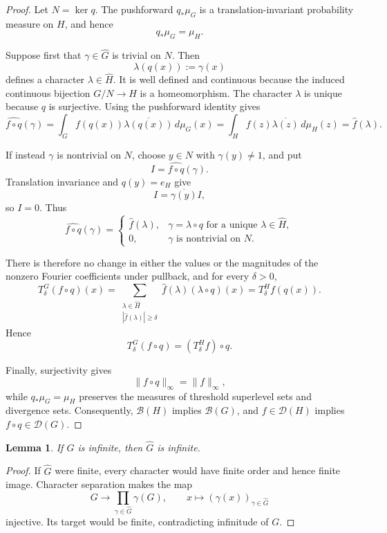 \documentclass[11pt]{amsart}
\newtheorem{lemma}[theorem]{Lemma}
\theoremstyle{definition}
\theoremstyle{remark}
\newcommand{\B}{\mathcal B}
\newcommand{\D}{\mathcal D}
\begin{document}
\begin{proof}
Let \(N=\ker q\). The pushforward \(q_*\mu_G\) is a
translation-invariant probability measure on \(H\), and hence
\[
 q_*\mu_G=\mu_H.
\]

Suppose first that \(\gamma\in\widehat G\) is trivial on \(N\). Then
\[
 \lambda(q(x)):=\gamma(x)
\]
defines a character \(\lambda\in\widehat H\). It is well defined and
continuous because the induced continuous bijection \(G/N\to H\) is a
homeomorphism. The character \(\lambda\) is unique because \(q\) is
surjective. Using the pushforward identity gives
\[
 \widehat{f\circ q}(\gamma)
 =\int_G f(q(x))\overline{\lambda(q(x))}\,d\mu_G(x)
 =\int_H f(z)\overline{\lambda(z)}\,d\mu_H(z)
 =\widehat f(\lambda).
\]

If instead \(\gamma\) is nontrivial on \(N\), choose \(y\in N\) with
\(\gamma(y)\neq1\), and put
\[
I=\widehat{f\circ q}(\gamma).
\]
Translation invariance and \(q(y)=e_H\) give
\[
 I=\overline{\gamma(y)}I,
\]
so \(I=0\). Thus
\[
 \widehat{f\circ q}(\gamma)
 =
 \begin{cases}
  \widehat f(\lambda),
   & \gamma=\lambda\circ q
     \text{ for a unique }\lambda\in\widehat H,\\
  0,
   & \gamma\text{ is nontrivial on }N.
 \end{cases}
\]

There is therefore no change in either the values or the magnitudes of
the nonzero Fourier coefficients under pullback, and for every
\(\delta>0\),
\[
 T_\delta^G(f\circ q)(x)
 =
 \sum_{\substack{\lambda\in\widehat H\\
                  |\widehat f(\lambda)|\ge\delta}}
 \widehat f(\lambda)(\lambda\circ q)(x)
 =T_\delta^Hf(q(x)).
\]
Hence
\[
T_\delta^G(f\circ q)=(T_\delta^Hf)\circ q.
\]

Finally, surjectivity gives
\[
 \|f\circ q\|_\infty=\|f\|_\infty,
\]
while \(q_*\mu_G=\mu_H\) preserves the measures of threshold
superlevel sets and divergence sets. Consequently, \(\B(H)\) implies
\(\B(G)\), and \(f\in\D(H)\) implies \(f\circ q\in\D(G)\).
\end{proof}



\begin{lemma}\label{main:infinitedual}
If \(G\) is infinite, then \(\widehat G\) is infinite.
\end{lemma}

\begin{proof}
If \(\widehat G\) were finite, every character would have finite
order and hence finite image. Character separation makes the map
\[
 G\longrightarrow\prod_{\gamma\in\widehat G}\gamma(G),
 \qquad x\longmapsto(\gamma(x))_{\gamma\in\widehat G}
\]
injective. Its target would be finite, contradicting infinitude of \(G\).
\end{proof}
\end{document}
